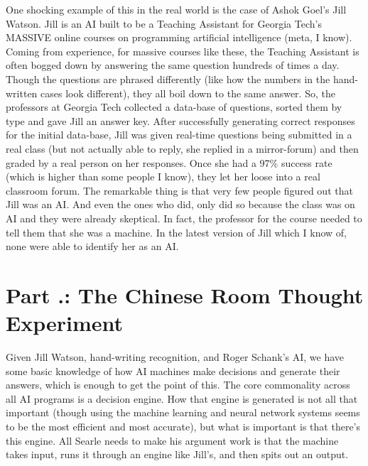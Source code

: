 One shocking example of this in the real world is the case of Ashok Goel's Jill Watson\autocite{JillWatson1}. Jill is an AI built to be a Teaching Assistant for Georgia Tech's MASSIVE online courses on programming artificial intelligence (meta, I know). Coming from experience, for massive courses like these, the Teaching Assistant is often bogged down by answering the same question hundreds of times a day. Though the questions are phrased differently (like how the numbers in the hand-written cases look different), they all boil down to the same answer.  So, the professors at Georgia Tech collected a data-base of questions, sorted them by type and gave Jill an answer key. After successfully generating correct responses for the initial data-base, Jill was given real-time questions being submitted in a real class (but not actually able to reply, she replied in a mirror-forum) and then graded by a real person on her responses. Once she had a 97\% success rate (which is higher than some people I know), they let her loose into a real classroom forum. The remarkable thing is that very few people figured out that Jill was an AI. And even the ones who did, only did so because the class was on AI and they were already skeptical. In fact, the professor for the course needed to tell them that she was a machine. In the latest version of Jill which I know of, none were able to identify her as an AI.

\section{Part \thechapcount.\theseccount: The Chinese Room Thought Experiment}

Given Jill Watson, hand-writing recognition, and Roger Schank's AI, we have some basic knowledge of how AI machines make decisions and generate their answers, which is enough to get the point of this. The core commonality across all AI programs is a decision engine. How that engine is generated is not all that important (though using the machine learning and neural network systems seems to be the most efficient and most accurate), but what is important is that there's this engine. All Searle needs to make his argument work is that the machine takes input, runs it through an engine like Jill's, and then spits out an output. 

